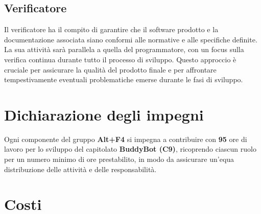 \documentclass[a4paper, 12pt]{article}
\begin{document}
\subsection{Verificatore}
Il verificatore ha il compito di garantire che il software prodotto e la documentazione associata siano conformi alle normative e alle specifiche definite. 
La sua attività sarà parallela a quella del programmatore, con un focus sulla verifica continua durante tutto il processo di sviluppo. 
Questo approccio è cruciale per assicurare la qualità del prodotto finale e per affrontare tempestivamente eventuali problematiche emerse durante le fasi di sviluppo.

\newpage
\section {Dichiarazione degli impegni}
Ogni componente del gruppo \textbf{Alt+F4} si impegna a contribuire con \textbf{95} ore di lavoro per lo sviluppo del capitolato
\textbf{BuddyBot (C9)}, ricoprendo ciascun ruolo per un numero minimo di ore prestabilito, in modo da assicurare un’equa distribuzione delle attività e delle responsabilità.
\section{Costi}
\end{document}
